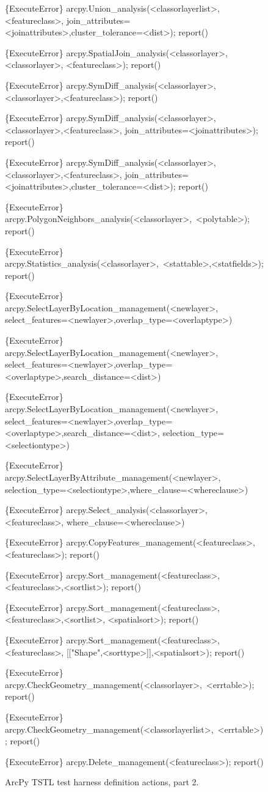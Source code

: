 \begin{figure}
{\begin{code}
\{ExecuteError\} arcpy.Union\_analysis(<classorlayerlist>,<featureclass>,
   join\_attributes=<joinattributes>,cluster\_tolerance=<dist>); report()

\{ExecuteError\} arcpy.SpatialJoin\_analysis(<classorlayer>,<classorlayer>,
   <featureclass>); report()

\{ExecuteError\} arcpy.SymDiff\_analysis(<classorlayer>,<classorlayer>,<featureclass>);
   report()

\{ExecuteError\} arcpy.SymDiff\_analysis(<classorlayer>,<classorlayer>,<featureclass>,
   join\_attributes=<joinattributes>); report()

\{ExecuteError\} arcpy.SymDiff\_analysis(<classorlayer>,<classorlayer>,<featureclass>,
   join\_attributes=<joinattributes>,cluster\_tolerance=<dist>); report()

\{ExecuteError\} arcpy.PolygonNeighbors\_analysis(<classorlayer>,~<polytable>); report()

\{ExecuteError\} arcpy.Statistics\_analysis(<classorlayer>,~<stattable>,<statfields>);
   report()

\{ExecuteError\} arcpy.SelectLayerByLocation\_management(<newlayer>,
   select\_features=<newlayer>,overlap\_type=<overlaptype>)

\{ExecuteError\} arcpy.SelectLayerByLocation\_management(<newlayer>,
   select\_features=<newlayer>,overlap\_type=<overlaptype>,search\_distance=<dist>)

\{ExecuteError\} arcpy.SelectLayerByLocation\_management(<newlayer>,
   select\_features=<newlayer>,overlap\_type=<overlaptype>,search\_distance=<dist>,
   selection\_type=<selectiontype>)

\{ExecuteError\} arcpy.SelectLayerByAttribute\_management(<newlayer>,
   selection\_type=<selectiontype>,where\_clause=<whereclause>)

\{ExecuteError\} arcpy.Select\_analysis(<classorlayer>,<featureclass>,
   where\_clause=<whereclause>)

\{ExecuteError\} arcpy.CopyFeatures\_management(<featureclass>,<featureclass>); report()

\{ExecuteError\} arcpy.Sort\_management(<featureclass>,<featureclass>,<sortlist>);
   report()

\{ExecuteError\} arcpy.Sort\_management(<featureclass>,<featureclass>,<sortlist>,
   <spatialsort>); report()

\{ExecuteError\} arcpy.Sort\_management(<featureclass>,<featureclass>,
   [["Shape",<sorttype>]],<spatialsort>); report()

\{ExecuteError\} arcpy.CheckGeometry\_management(<classorlayer>,~<errtable>); report()

\{ExecuteError\} arcpy.CheckGeometry\_management(<classorlayerlist>,~<errtable>); report()

\{ExecuteError\} arcpy.Delete\_management(<featureclass>); report()
\end{code}
}
\caption{ArcPy TSTL test harness definition actions, part 2.}
\label{actions2}
\end{figure}



